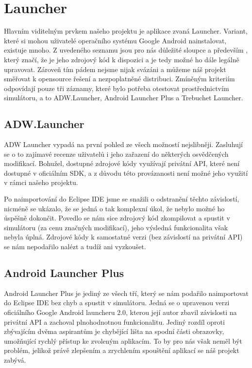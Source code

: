 \documentclass[thesis=M,czech]{FITthesis}[2012/06/26]
\begin{document}
\section{Launcher}
Hlavním viditelným prvkem našeho projektu je aplikace zvaná Launcher. Variant, které si mohou uživatelé operačního systému Google Android nainstalovat, existuje mnoho\cite{launchers_list}. Z uvedeného seznamu jsou pro nás důležité sloupce  a především , který značí, že je jeho zdrojový kód k dispozici a je tedy možné ho dále legálně upravovat. Zároveň tím pádem nejsme nijak svázáni a můžeme náš projekt směřovat k opensource řešení a nezpoplatněné distribuci. Zmíněným kriteriím odpovídají pouze tři záznamy, které bylo potřeba otestovat prostřednictvím simulátoru, a to ADW.Launcher, Android Launcher Plus a Trebuchet Launcher.

\subsection{ADW.Launcher}
ADW Launcher vypadá na první pohled ze všech možností nejslibněji. Zasluhují se o to zajímavé recenze uživatelů i jeho zařazení do některých osvědčených modifikací. Bohužel, dostupné zdrojové kódy využívají privátní API, které není dostupné v oficiálním SDK, a z důvodu této provázanosti není možné jeho využití v rámci našeho projektu.

Po naimportování do Eclipse IDE jsme se snažili o odstranění těchto závislostí, nicméně se ukázalo, že se jedná o tak komplexní úkol, že nebylo možné ho úspěšně dokončit. Povedlo se nám sice zdrojový kód zkompilovat a spustit v simulátoru (za cenu značných modifikací), jeho výsledná funkcionalita však nebyla úplná. Zdrojové kódy k samostatné verzi (bez závislostí na privátní API) se nám nepodařilo nalézt a tudíž ani vyzkoušet.

\subsection{Android Launcher Plus}
Android Launcher Plus je jediný ze všech tří, který se nám podařilo naimportovat do Eclipse IDE bez chyb a spustit v simulátoru. Jedná se o upravenou verzi oficiálního Google Android launcheru 2.0, kterou její autor zbavil závislosti na privátní API a zachoval plnohodnotnou funkcionalitu. Jediný rozdíl oproti zbývajícím dvěma aspirantům je chybějící lišta na spodní části obrazovky, umožňující rychlý přístup ke zvoleným aplikacím. To by pro nás však neměl být problém, jelikož právě zlepšením a zrychlením spouštění aplikací se náš projekt zabývá.
\end{document}
